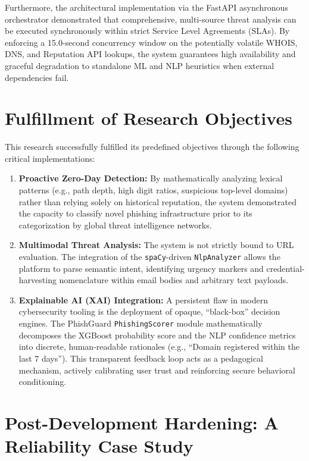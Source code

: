 Furthermore, the architectural implementation via the FastAPI
asynchronous orchestrator demonstrated that comprehensive, multi-source
threat analysis can be executed synchronously within strict Service
Level Agreements (SLAs). By enforcing a 15.0-second concurrency window
on the potentially volatile WHOIS, DNS, and Reputation API lookups, the
system guarantees high availability and graceful degradation to
standalone ML and NLP heuristics when external dependencies fail.

\section{Fulfillment of Research
Objectives}\label{fulfillment-of-research-objectives}

This research successfully fulfilled its predefined objectives through
the following critical implementations:

\begin{enumerate}

\item
  \textbf{Proactive Zero-Day Detection:} By mathematically analyzing
  lexical patterns (e.g., path depth, high digit ratios, suspicious
  top-level domains) rather than relying solely on historical
  reputation, the system demonstrated the capacity to classify novel
  phishing infrastructure prior to its categorization by global threat
  intelligence networks.
\item
  \textbf{Multimodal Threat Analysis:} The system is not strictly bound
  to URL evaluation. The integration of the \texttt{spaCy}-driven
  \texttt{NlpAnalyzer} allows the platform to parse semantic intent,
  identifying urgency markers and credential-harvesting nomenclature
  within email bodies and arbitrary text payloads.
\item
  \textbf{Explainable AI (XAI) Integration:} A persistent flaw in modern
  cybersecurity tooling is the deployment of opaque, ``black-box''
  decision engines. The PhishGuard \texttt{PhishingScorer} module
  mathematically decomposes the XGBoost probability score and the NLP
  confidence metrics into discrete, human-readable rationales (e.g.,
  ``Domain registered within the last 7 days''). This transparent
  feedback loop acts as a pedagogical mechanism, actively calibrating
  user trust and reinforcing secure behavioral conditioning.
\end{enumerate}

\section{Post-Development Hardening: A Reliability Case
Study}\label{post-development-hardening}

